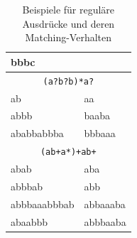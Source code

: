 \begin{table}[p]
\begin{center}
\begin{tabular}{ll}
      bbbc & \\
    \hline
      \multicolumn{2}{c}{\texttt{(a?b?b)*a?}} \\
    \hline
      ab & aa \\
      abbb & baaba \\
      ababbabbba & bbbaaa \\
    \hline
      \multicolumn{2}{c}{\texttt{(ab+a*)+ab+}} \\
    \hline
      abab & aba \\
      abbbab & abb \\
      abbbaaabbbab & abbaaaba \\
      abaabbb & abbbaaba \\
    \hline \hline
  \end{tabular}
  \caption{Beispiele für reguläre Ausdrücke und deren Matching-Verhalten}
  \label{tab:regex_examples}
 \end{center}
\end{table}

